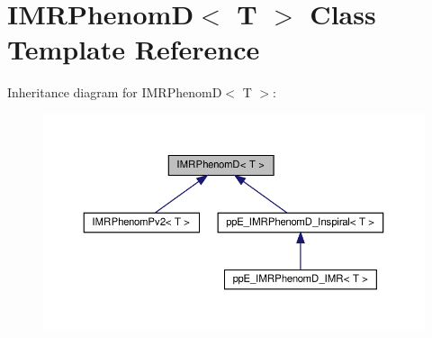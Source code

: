 \hypertarget{classIMRPhenomD}{}\section{I\+M\+R\+PhenomD$<$ T $>$ Class Template Reference}
\label{classIMRPhenomD}


Inheritance diagram for I\+M\+R\+PhenomD$<$ T $>$\+:\nopagebreak
\begin{figure}[H]
\begin{center}
\leavevmode
\includegraphics[width=350pt]{classIMRPhenomD__inherit__graph}
\end{center}
\end{figure}

